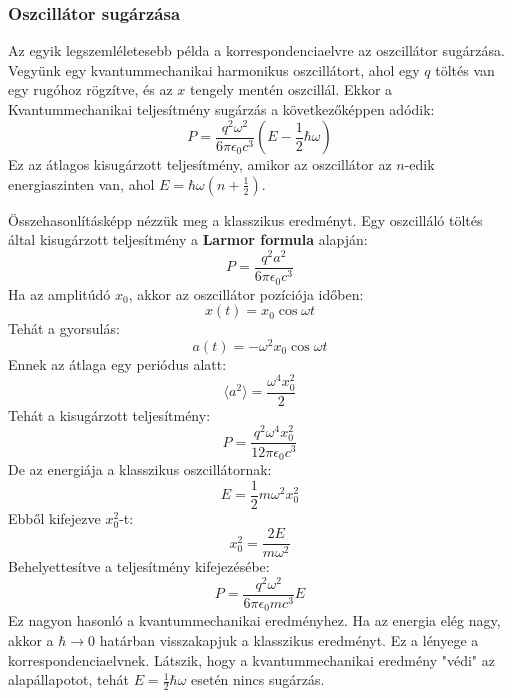 \documentclass[../main.tex]{subfiles}
\begin{document}
\subsubsection{Oszcillátor sugárzása}
Az egyik legszemléletesebb példa a korrespondenciaelvre az oszcillátor sugárzása. Vegyünk egy kvantummechanikai harmonikus oszcillátort, ahol egy $q$ töltés van egy rugóhoz rögzítve, és az $x$ tengely mentén oszcillál.
Ekkor a Kvantummechanikai teljesítmény sugárzás a következőképpen adódik:
\begin{equation}
    P = \frac{q^2 \omega^2}{6 \pi \epsilon_0 c^3} \left(E - \frac{1}{2} \hbar \omega \right)
\end{equation}
Ez az átlagos kisugárzott teljesítmény, amikor az oszcillátor az $n$-edik energiaszinten van, ahol $E = \hbar \omega (n + \frac{1}{2})$.

Összehasonlításképp nézzük meg a klasszikus eredményt. Egy oszcilláló töltés által kisugárzott teljesítmény a \textbf{Larmor formula} alapján:
\begin{equation}
    P = \frac{q^2 a^2}{6 \pi \epsilon_0 c^3}
\end{equation}
Ha az amplitúdó $x_0$, akkor az oszcillátor pozíciója időben:
\begin{equation}
    x(t) = x_0 \cos \omega t
\end{equation}
Tehát a gyorsulás:
\begin{equation}
    a(t) = - \omega^2 x_0 \cos \omega t
\end{equation}
Ennek az átlaga egy periódus alatt:
\begin{equation}
    \langle a^2 \rangle = \frac{\omega^4 x_0^2}{2}
\end{equation}
Tehát a kisugárzott teljesítmény:
\begin{equation}
    P = \frac{q^2 \omega^4 x_0^2}{12 \pi \epsilon_0 c^3}
\end{equation}
De az energiája a klasszikus oszcillátornak:
\begin{equation}
    E = \frac{1}{2} m \omega^2 x_0^2
\end{equation}
Ebből kifejezve $x_0^2$-t:
\begin{equation}
    x_0^2 = \frac{2E}{m \omega^2}
\end{equation}
Behelyettesítve a teljesítmény kifejezésébe:
\begin{equation}
    P = \frac{q^2 \omega^2}{6 \pi \epsilon_0 m c^3} E
\end{equation}
Ez nagyon hasonló a kvantummechanikai eredményhez. Ha az energia elég nagy, akkor a $\hbar \to 0$ határban visszakapjuk a klasszikus eredményt. Ez a lényege a korrespondenciaelvnek.
Látszik, hogy a kvantummechanikai eredmény "védi" az alapállapotot, tehát $E = \frac{1}{2} \hbar \omega$ esetén nincs sugárzás.
\end{document}
